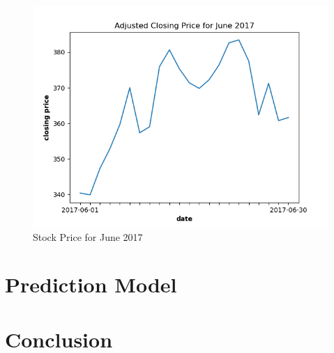 \documentclass[12pt, notitlepage]{article}
\begin{document}
\begin{figure}[h!]
	\centering
	\includegraphics[scale=0.8]{images/stock_overtime.png}
	\caption{Stock Price for June 2017}
	\label{fig:SP}
\end{figure}
\clearpage
\pagebreak

\section{Prediction Model}

\section{Conclusion}
\end{document}
